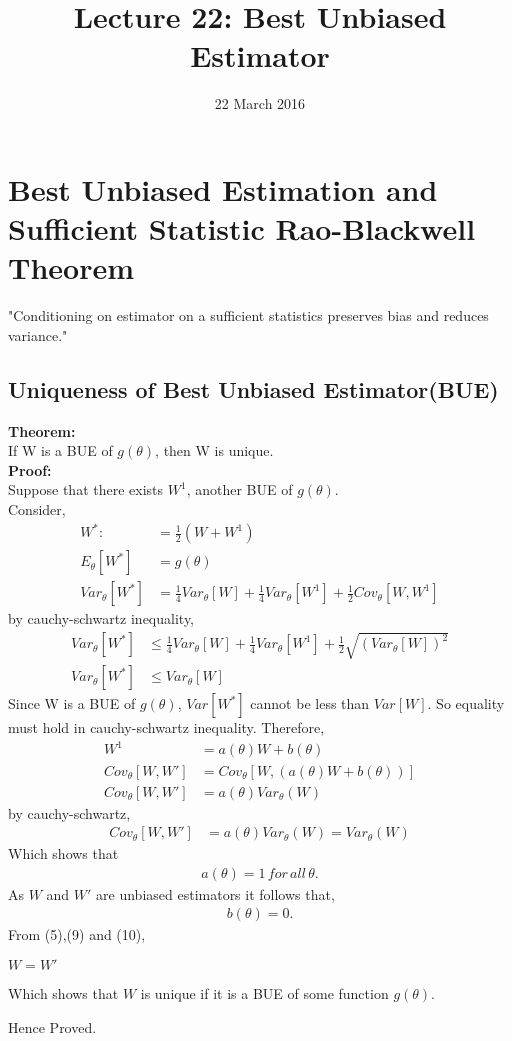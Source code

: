 \documentclass[12pt,a4paper]{article}
\begin{document}
\title{Lecture 22: Best Unbiased Estimator}
\date{22 March 2016}
\author{}
\maketitle
\section{Best Unbiased Estimation and Sufficient Statistic Rao-Blackwell Theorem}
"Conditioning on estimator on a sufficient statistics preserves bias and reduces variance."
\subsection{Uniqueness of Best Unbiased Estimator(BUE)}
\textbf{Theorem:} \\If W is a BUE of $g(\theta)$, then W is unique.\\
\textbf{Proof:}\\ Suppose that there exists $W^1$, another BUE of $g(\theta)$.\\
Consider, 
\begin{align}
W^*:&=\frac{1}{2}(W+W^1)\\
E_\theta[W^*] &= g(\theta)\\
Var_\theta[W^*] &= \frac{1}{4}Var_\theta[W]+\frac{1}{4}Var_\theta[W^1]+\frac{1}{2}Cov_\theta[W,W^1]
\end{align}
by cauchy-schwartz inequality,
\begin{align}
\nonumber
Var_\theta[W^*]&\leq\frac{1}{4}Var_\theta[W]+\frac{1}{4}Var_\theta[W^1]+\frac{1}{2}\sqrt{(Var_\theta[W])^2}\\
Var_\theta[W^*]&\leq Var_\theta[W]
\end{align}
Since W is a BUE of $g(\theta)$, $Var[W^*]$ cannot be less than $Var[W]$.
So equality must hold in  cauchy-schwartz inequality. Therefore,\\
\begin{align}
W^1&=a(\theta) W + b(\theta)\\
Cov_\theta[W,W']&=Cov_\theta[W,(a(\theta)W+b(\theta))]\\
Cov_\theta[W,W']&=a(\theta)Var_\theta(W)
\end{align}
by cauchy-schwartz,
\begin{align}
Cov_\theta[W,W']&=a(\theta)Var_\theta(W)=Var_\theta(W)
\end{align}
Which shows that 
\begin{align}
a(\theta)=1\, for \,all \,\theta.
\end{align}
As $W$ and $W'$ are unbiased estimators it follows that,
\begin{align}
b(\theta)=0. 
\end{align}
From (5),(9) and (10),\\
\begin{center}
$W=W'$
\end{center}
Which shows that $W$ is unique if it is a BUE of some function $g(\theta).$
\begin{center}
Hence Proved.
\end{center}
\end{document}
